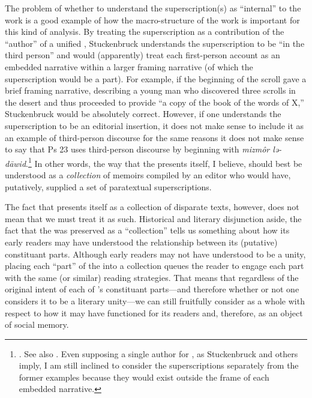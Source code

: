 The problem of whether to understand the superscription(s) as ``internal'' to the work is a good example of how the macro-structure of the work is important for this kind of analysis. By treating the superscription as a contribution of the ``author'' of a unified \ga, Stuckenbruck understands the superscription to be ``in the third person'' and would (apparently) treat each first-person account as an embedded narrative within a larger framing narrative (of which the superscription would be a part). For example, if the beginning of the scroll gave a brief framing narrative, describing a young man who discovered three scrolls in the desert and thus proceeded to provide ``a copy of the book of the words of X,'' Stuckenbruck would be absolutely correct. However, if one understands the superscription to be an editorial insertion, it does not make sense to include it as an example of third-person discourse for the same reasons it does not make sense to say that Ps 23 uses third-person discourse by beginning with \emph{mizmôr lə-dāwid}.\footnote{\cite[315--316]{stuckenbruck_roitman-etal2011}. See also \cite[15--16]{bernstein_chazon-etal1999}. Even supposing a single author for \ga, as Stuckenbruck and others imply, I am still inclined to consider the superscriptions separately from the former examples because they would exist outside the frame of each embedded narrative.}
In other words, the way that the \ga presents itself, I believe, should best be understood as a \emph{collection} of memoirs compiled by an editor who would have, putatively, supplied a set of paratextual superscriptions.

The fact that \ga presents itself as a collection of disparate texts, however, does not mean that we must treat it as such. Historical and literary disjunction aside, the fact that the \ga was preserved as a ``collection'' tells us something about how its early readers may have understood the relationship between its (putative) constituant parts. Although early readers may not have understood \ga to be a unity, placing each ``part'' of the \ga into a collection queues the reader to engage each part with the same (or similar) reading strategies. 
That means that regardless of the original intent of each of \ga's constituant parts---and therefore whether or not one considers it to be a literary unity---we can still fruitfully consider \ga as a whole with respect to how it may have functioned for its readers and, therefore, as an object of social memory.

